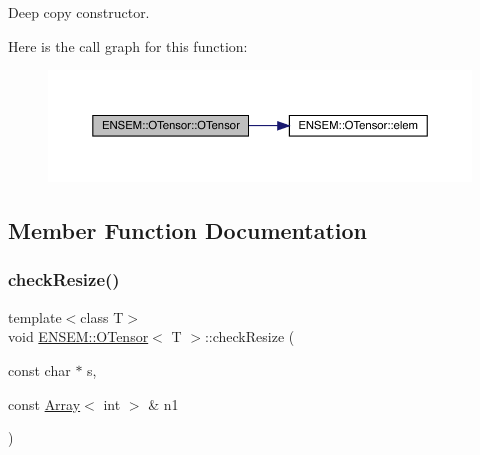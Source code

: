 Deep copy constructor. 

Here is the call graph for this function\+:
\nopagebreak
\begin{figure}[H]
\begin{center}
\leavevmode
\includegraphics[width=350pt]{da/d8a/classENSEM_1_1OTensor_aaf07253b5940da32a50af556d2f2afc6_cgraph}
\end{center}
\end{figure}


\subsection{Member Function Documentation}
\mbox{\label{classENSEM_1_1OTensor_aa273eae7f1de4b37e91302da5edf279b}} 
\subsubsection{\texorpdfstring{checkResize()}{checkResize()}\hspace{0.1cm}{\footnotesize\ttfamily [1/4]}}
{\footnotesize\ttfamily template$<$class T$>$ \\
void \mbox{\hyperlink{classENSEM_1_1OTensor}{E\+N\+S\+E\+M\+::\+O\+Tensor}}$<$ T $>$\+::check\+Resize (\begin{DoxyParamCaption}\item[{const char $\ast$}]{s,  }\item[{const \mbox{\hyperlink{classXMLArray_1_1Array}{Array}}$<$ int $>$ \&}]{n1 }\end{DoxyParamCaption})\hspace{0.3cm}{\ttfamily [inline]}}

